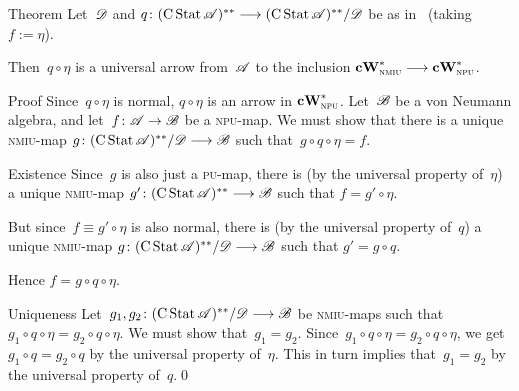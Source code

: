 \documentclass[main]{subfiles}
\begin{document}
\begin{parsec}
\begin{point}[cw-giry]{Theorem}
Let~$\mathscr{D}$ and $q\colon  (\operatorname{C}\operatorname{Stat}\mathscr{A})^{**}
\longrightarrow  (\operatorname{C}\operatorname{Stat}\mathscr{A})^{**}/\mathscr{D}$
be as in~
(taking $f:=\eta$).

Then~$q\circ \eta$ is a universal arrow from~$\mathscr{A}$
to the inclusion $\mathbf{cW}^*_{\text{\textsc{nmiu}}}\longrightarrow \mathbf{cW}^*_{\text{\textsc{npu}}}$.
\begin{point}{Proof}%
Since~$q\circ \eta$ is normal, $q\circ \eta$ is an arrow in
$\mathbf{cW}^*_{\text{\textsc{npu}}}$.
Let~$\mathscr{B}$ be a von Neumann algebra,
and let~$f\colon \mathscr{A}\to \mathscr{B}$
be a \textsc{npu}-map.
We must show that there is a unique \textsc{nmiu}-map
$g\colon 
(\operatorname{C}\operatorname{Stat}\mathscr{A})^{**}/\mathscr{D} \longrightarrow \mathscr{B}$
such that~$g\circ q\circ \eta = f$.
\begin{point}{Existence}
Since~$g$ is also just a \textsc{pu}-map,
there is (by the universal property of~$\eta$)
a unique \textsc{nmiu}-map $g'\colon 
(\operatorname{C}\operatorname{Stat}\mathscr{A})^{**} \longrightarrow \mathscr{B}$
such that $f=g'\circ \eta$.

But since~$f\equiv g'\circ \eta$ is also normal,
there is (by the universal property of~$q$) 
a unique \textsc{nmiu}-map $g\colon 
(\operatorname{C}\operatorname{Stat}\mathscr{A})^{**}/\mathscr{D} \longrightarrow \mathscr{B}$
such that $g'=g\circ q$. 

Hence $f=g\circ q \circ \eta$.
\end{point}
\begin{point}{Uniqueness}%
Let~$g_1,g_2\colon 
(\operatorname{C}\operatorname{Stat}\mathscr{A})^{**}/\mathscr{D} \longrightarrow \mathscr{B}$
be \textsc{nmiu}-maps
such that $g_1\circ q\circ \eta = g_2 \circ q \circ \eta$.
We must show that~$g_1=g_2$.
Since~$g_1\circ q \circ \eta = g_2 \circ q \circ \eta$,
we get  $g_1\circ q = g_2 \circ q$ by the universal property of~$\eta$.
This in turn implies that~$g_1=g_2$ by the universal property of~$q$.\qed
\end{point}
\end{point}
\end{point}
\end{parsec}
\end{document}
